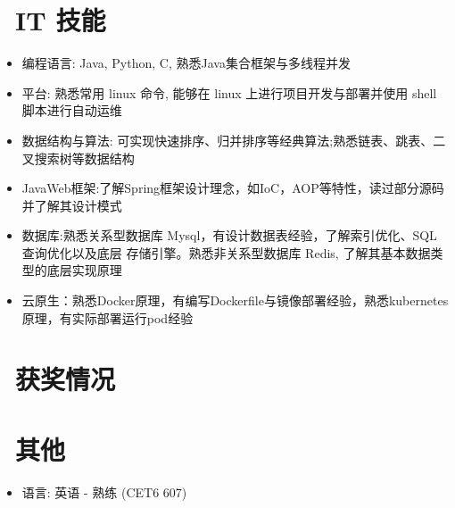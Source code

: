 \documentclass{resume}
\begin{document}

\section{\faCogs\ IT 技能}
\begin{itemize}[parsep=0.5ex]
  \item 编程语言: Java, Python, C, 熟悉Java集合框架与多线程并发
  \item 平台: 熟悉常用 linux 命令, 能够在 linux 上进行项目开发与部署并使用 shell 脚本进行自动运维
  \item 数据结构与算法: 可实现快速排序、归并排序等经典算法;熟悉链表、跳表、二叉搜索树等数据结构
  \item JavaWeb框架:了解Spring框架设计理念，如IoC，AOP等特性，读过部分源码并了解其设计模式
  \item 数据库:熟悉关系型数据库 Mysql，有设计数据表经验，了解索引优化、SQL 查询优化以及底层
 存储引擎。熟悉非关系型数据库 Redis, 了解其基本数据类型的底层实现原理
 \item 云原生：熟悉Docker原理，有编写Dockerfile与镜像部署经验，熟悉kubernetes原理，有实际部署运行pod经验
\end{itemize}

\section{\faHeartO\ 获奖情况}

\section{\faInfo\ 其他}
\begin{itemize}[parsep=0.5ex]
  \item 语言: 英语 - 熟练 (CET6 607)
\end{itemize}

%
%
\end{document}
